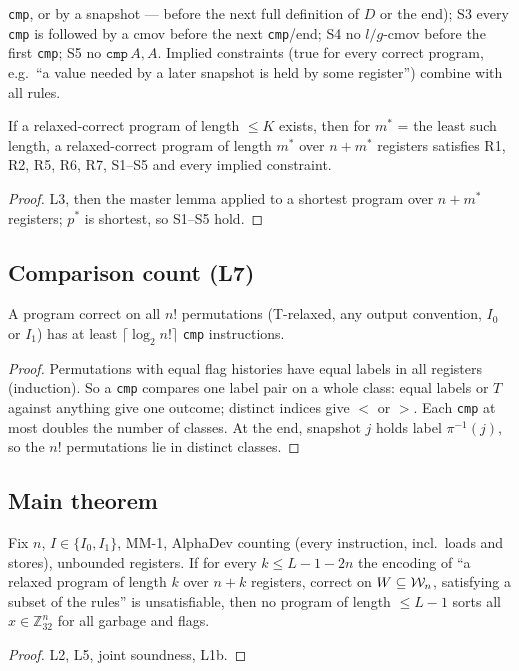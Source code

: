 \texttt{cmp}, or by a snapshot --- before the next full definition of $D$ or the end); S3 every \texttt{cmp} is followed by a
cmov before the next \texttt{cmp}/end; S4 no $l/g$-cmov before the first \texttt{cmp}; S5 no $\texttt{cmp}\,A,A$.
Implied constraints (true for every correct program, e.g.\ ``a value needed by a later snapshot is held by some register'')
combine with all rules.
\begin{theorem}
If a relaxed-correct \RS{} program of length $\le K$ exists, then for $m^\ast$ = the least such length, a relaxed-correct
\RS{} program of length $m^\ast$ over $n+m^\ast$ registers satisfies R1, R2, R5, R6, R7, S1--S5 and every implied constraint.
\end{theorem}
\begin{proof} L3, then the master lemma applied to a shortest program over $n+m^\ast$ registers; $p^\ast$ is shortest, so S1--S5
hold. \end{proof}

\subsection{Comparison count (L7)}
\begin{lemma}[L7] A program correct on all $n!$ permutations (T-relaxed, any output convention, $I_0$ or $I_1$) has at least
$\lceil\log_2 n!\rceil$ \texttt{cmp} instructions. \end{lemma}
\begin{proof} Permutations with equal flag histories have equal labels in all registers (induction). So a \texttt{cmp} compares
one label pair on a whole class: equal labels or $T$ against anything give one outcome; distinct indices give $\lt$ or $\gt$.
Each \texttt{cmp} at most doubles the number of classes. At the end, snapshot $j$ holds label $\pi^{-1}(j)$, so the $n!$
permutations lie in distinct classes. \end{proof}

\subsection{Main theorem}
\begin{theorem}
Fix $n$, $I\in\{I_0,I_1\}$, MM-1, AlphaDev counting (every instruction, incl.\ loads and stores), unbounded registers.
If for every $k\le L-1-2n$ the encoding of ``a relaxed \RS{} program of length $k$ over $n+k$ registers, correct on
$W\subseteq\mathcal{W}_n$, satisfying a subset of the rules'' is unsatisfiable, then no \MM{} program of length $\le L-1$ sorts all
$x\in\mathbb{Z}_{32}^n$ for all garbage and flags.
\end{theorem}
\begin{proof} L2, L5, joint soundness, L1b. \end{proof}
